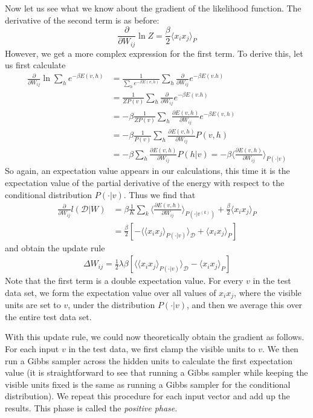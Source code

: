 \documentclass[a4paper, draft]{article}
\theoremstyle{own}
\theoremstyle{remark}
\begin{document}
Now let us see what we know about the gradient of the likelihood function. The derivative of the second term is as before:
$$
\frac{\partial}{\partial W_{ij}} \ln Z = \frac{\beta}{2} \langle x_i x_j \rangle_P
$$
However, we get a more complex expression for the first term. To derive this, let us first calculate
\begin{align*}
\frac{\partial }{\partial W_{ij}} \ln \sum_h e^{-\beta E(v,h)} &= 
\frac{1}{\sum_h e^{-\beta E(v,h)}} \sum_h \frac{\partial }{\partial W_{ij}}
e^{-\beta E(v.h)} \\
&= \frac{1}{Z  P(v)} \sum_h \frac{\partial }{\partial W_{ij}}
e^{-\beta E(v.h)} \\
&= - \beta \frac{1}{Z  P(v)} \sum_h \frac{\partial E(v,h)}{\partial W_{ij}} e^{-\beta E(v,h)} \\
&= - \beta \frac{1}{P(v)} \sum_h \frac{\partial E(v,h)}{\partial W_{ij}} P(v,h) \\
&= - \beta \sum_h \frac{\partial E(v,h)}{\partial W_{ij}} P(h | v)  
= - \beta \langle \frac{\partial E(v,h)}{\partial W_{ij}} \rangle_{P(\cdot | v)}
\end{align*}
So again, an expectation value appears in our calculations, this time it is the expectation value of the partial derivative of the energy with respect to the conditional distribution $P(\cdot | v)$. Thus we find that
\begin{align*}
\frac{\partial }{\partial W_{ij}} l({\mathcal D} | W) &= 
 \beta \frac{1}{K} \sum_k \langle \frac{\partial E(v,h)}{\partial W_{ij}} \rangle_{P(\cdot | v^{(k)})} + \frac{\beta}{2} \langle x_i x_j \rangle_P \\
 &= \frac{\beta}{2} \left[
 - \langle \langle  x_i x_j \rangle_{P(\cdot | v)} \rangle_{\mathcal D}
 + \langle x_i x_j \rangle_P  \right]
\end{align*}
and obtain the update rule
\begin{align}\label{eq:boltzmannhiddenupdaterule}
\Delta W_{ij} = \frac{1}{2} \lambda \beta \left[
 \langle \langle  x_i x_j \rangle_{P(\cdot | v)} \rangle_{\mathcal D} 
 - 
 \langle x_i x_j \rangle_P  
 \right] 
\end{align}
Note that the first term is a double expectation value. For every $v$ in the test data set, we form the expectation value over all values of $x_i x_j$, where the visible units are set to $v$, under the distribution $P(\cdot | v)$, and then we average this over the entire test data set.

With this update rule, we could now theoretically obtain the gradient as follows. For each input $v$ in the test data, we first clamp the visible units to $v$. We then run a Gibbs sampler across the hidden units to calculate the first expectation value (it is straightforward to see that running a Gibbs sampler while keeping the visible units fixed is the same as running a Gibbs sampler for the conditional distribution). We repeat this procedure for each input vector and add up the results. This phase is called the {\em positive phase}. 
\end{document}
